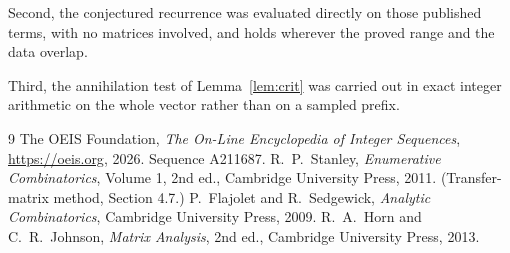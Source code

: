 \documentclass[11pt,a4paper]{article}
\theoremstyle{plain}
\theoremstyle{definition}
\begin{document}
Second, the conjectured recurrence was evaluated directly on those published terms, with no
matrices involved, and holds wherever the proved range and the data overlap.

Third, the annihilation test of Lemma~\ref{lem:crit} was carried out in exact integer
arithmetic on the whole vector rather than on a sampled prefix.

\begin{thebibliography}{9}
 The OEIS Foundation, \emph{The On-Line Encyclopedia of Integer
Sequences}, \url{https://oeis.org}, 2026. Sequence A211687.
 R.~P.~Stanley, \emph{Enumerative Combinatorics}, Volume 1, 2nd ed.,
Cambridge University Press, 2011. (Transfer-matrix method, Section 4.7.)
 P.~Flajolet and R.~Sedgewick, \emph{Analytic Combinatorics}, Cambridge
University Press, 2009.
 R.~A.~Horn and C.~R.~Johnson, \emph{Matrix Analysis}, 2nd ed., Cambridge
University Press, 2013.
\end{thebibliography}
\end{document}
